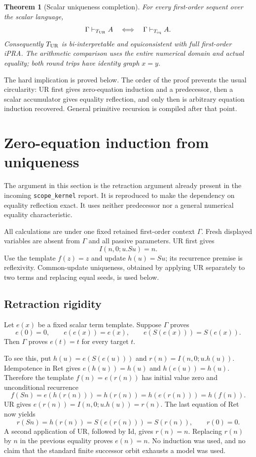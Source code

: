 \documentclass[11pt]{article}
\newtheorem{theorem}{Theorem}[section]
\theoremstyle{definition}\newtheorem{definition}[theorem]{Definition}
\begin{document}
\begin{theorem}[Scalar uniqueness completion]
For every first-order sequent over the scalar language,
\[
                  \Gamma\vdash_{T_{\rm UR}} A
       \quad\Longleftrightarrow\quad
                  \Gamma\vdash_{T_{\rm eq}} A.
\]
Consequently $T_{\rm UR}$ is bi-interpretable and equiconsistent with full
first-order iPRA.  The arithmetic comparison uses the entire numerical
domain and actual equality; both round trips have identity graph $x=y$.
\end{theorem}

The hard implication is proved below.  The order of the proof prevents
the usual circularity: UR first gives zero-equation induction and a
predecessor, then a scalar accumulator gives equality reflection, and
only then is arbitrary equation induction recovered.  General
primitive recursion is compiled after that point.

\section{Zero-equation induction from uniqueness}
\label{sec:ur-retraction-complete}

The argument in this section is the retraction argument already present in
the incoming \texttt{scope\_kernel} report.  It is reproduced to make the
dependency on equality reflection exact.  It uses neither predecessor nor
a general numerical equality characteristic.

All calculations are under one fixed retained first-order context
$\Gamma$.  Fresh displayed variables are absent from $\Gamma$ and all
passive parameters.  UR first gives
\[
                         I(n,0;u.Su)=n.                  \tag{Id}
\]
Use the template $f(z)=z$ and update $h(u)=Su$; its recurrence premise is
reflexivity.  Common-update uniqueness, obtained by applying UR separately
to two terms and replacing equal seeds, is used below.

\subsection{Retraction rigidity}
Let $e(x)$ be a fixed scalar term template.  Suppose $\Gamma$ proves
\[
 e(0)=0,\qquad e(e(x))=e(x),\qquad e(S(e(x)))=S(e(x)).    \tag{Ret}
\]
Then $\Gamma$ proves $e(t)=t$ for every target $t$.

To see this, put $h(u)=e(S(e(u)))$ and $r(n)=I(n,0;u.h(u))$.
Idempotence in Ret gives $e(h(u))=h(u)$ and $h(e(u))=h(u)$.
Therefore the template $f(n)=e(r(n))$ has initial value zero and
unconditional recurrence
\[
 f(Sn)=e(h(r(n)))=h(r(n))=h(e(r(n)))=h(f(n)).
\]
UR gives $e(r(n))=I(n,0;u.h(u))=r(n)$.
The last equation of Ret now yields
\[
 r(Sn)=h(r(n))=S(e(r(n)))=S(r(n)),\qquad r(0)=0.
\]
A second application of UR, followed by Id, gives $r(n)=n$.
Replacing $r(n)$ by $n$ in the previous equality proves $e(n)=n$.
No induction was used, and no claim that the standard finite successor
orbit exhausts a model was used.
\end{document}
